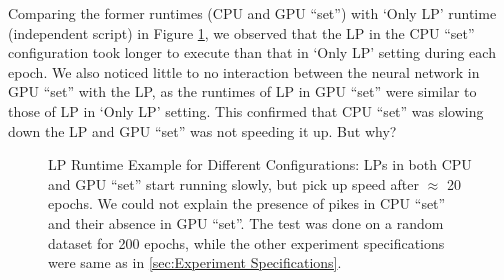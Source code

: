 \begin{appendices}
    Comparing the former runtimes (CPU and GPU ``set'') with `Only LP' runtime (independent script) in Figure \ref{fig:LP Runtime Example for Different Configurations}, we observed that the LP in the CPU ``set'' configuration took longer to execute than that in  `Only LP' setting during each epoch. We also noticed little to no interaction between the neural network in GPU ``set'' with the LP, as the runtimes of LP in GPU ``set'' were similar to those of LP in `Only LP' setting. This confirmed that CPU ``set'' was slowing down the LP and GPU ``set'' was not speeding it up. But why?
    \begin{figure}[!htbp]
        \centering
        \caption[LP Runtime Example for Different Configurations]{LP Runtime Example for Different Configurations: LPs in both CPU and GPU ``set'' start running slowly, but pick up speed after $\approx$ 20 epochs. We could not explain the presence of pikes in CPU ``set'' and their absence in GPU ``set''. The test was done on a random dataset for 200 epochs, while the other experiment specifications were same as in \cref{sec:Experiment Specifications}.}
        \label{fig:LP Runtime Example for Different Configurations}
    \end{figure}
    

\end{appendices}
